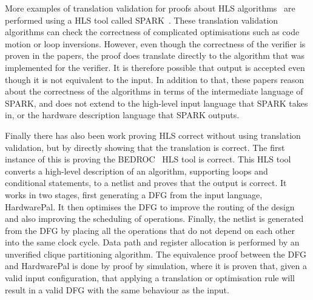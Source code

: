 More examples of translation validation for proofs about HLS
algorithms~\cite{karfa06_formal_verif_method_sched_high_synth,
  karfa07_hand_verif_high_synth, kundu07_autom,
  karfa08_equiv_check_method_sched_verif, kundu08_valid_high_level_synth,
  karfa10_verif_datap_contr_gener_phase, karfa12_formal_verif_code_motion_techn,
  chouksey19_trans_valid_code_motion_trans_invol_loops,
  chouksey20_verif_sched_condit_behav_high_level_synth} are performed using a
HLS tool called SPARK~\cite{gupta03_spark}.  These translation validation
algorithms can check the correctness of complicated optimisations such as code
motion or loop inversions.  However, even though the correctness of the verifier
is proven in the papers, the proof does translate directly to the algorithm that
was implemented for the verifier.  It is therefore possible that output is
accepted even though it is not equivalent to the input.  In addition to that,
these papers reason about the correctness of the algorithms in terms of the
intermediate language of SPARK, and does not extend to the high-level input
language that SPARK takes in, or the hardware description language that SPARK
outputs.

Finally there has also been work proving HLS correct without using translation
validation, but by directly showing that the translation is correct.  The first
instance of this is proving the BEDROC~\cite{chapman92_verif_bedroc} HLS tool is
correct.  This HLS tool converts a high-level description of an algorithm,
supporting loops and conditional statements, to a netlist and proves that the
output is correct.  It works in two stages, first generating a DFG from the
input language, HardwarePal.  It then optimises the DFG to improve the routing
of the design and also improving the scheduling of operations.  Finally, the
netlist is generated from the DFG by placing all the operations that do not
depend on each other into the same clock cycle.  Data path and register
allocation is performed by an unverified clique partitioning algorithm.  The
equivalence proof between the DFG and HardwarePal is done by proof by
simulation, where it is proven that, given a valid input configuration, that
applying a translation or optimisation rule will result in a valid DFG with the
same behaviour as the input.

